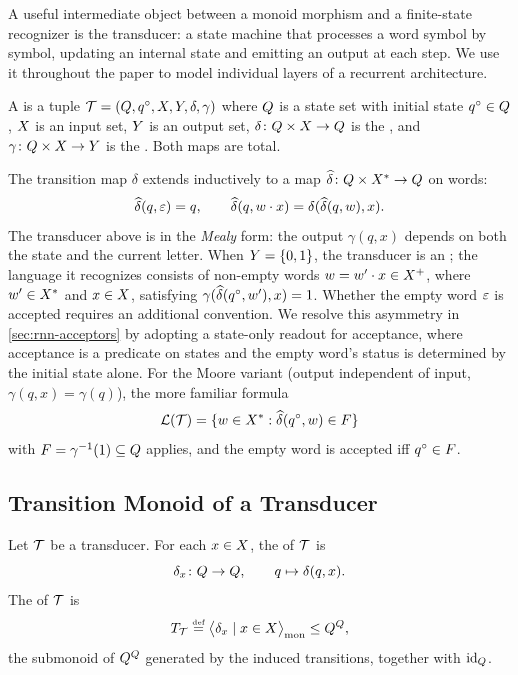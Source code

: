 \documentclass{article}
\begin{document}
A useful intermediate object between a monoid morphism and a finite-state recognizer is the transducer: a state machine that processes a word symbol by symbol, updating an internal state and emitting an output at each step. 
We use it throughout the paper to model individual layers of a recurrent architecture.

\begin{definition}
A  is a tuple $\mathcal{T} = (Q, q^{\circ}, X, Y, \delta, \gamma)$ where $Q$ is a state set with initial state $q^{\circ} \in Q$, $X$ is an input set, $Y$ is an output set, $\delta \colon Q \times X \to Q$ is the , and $\gamma \colon Q \times X \to Y$ is the . 
Both maps are total.
\end{definition}

The transition map $\delta$ extends inductively to a map $\widehat{\delta} \colon Q \times X^* \to Q$ on words:
$$
\widehat{\delta}(q, \varepsilon) = q, \qquad \widehat{\delta}(q, w \cdot x) = \delta(\widehat{\delta}(q, w), x).
$$
The transducer above is in the \emph{Mealy} form: the output $\gamma(q, x)$ depends on both the state and the current letter. When $Y = \{0, 1\}$, the transducer is an ; the language it recognizes consists of non-empty words $w = w' \cdot x \in X^+$, where $w' \in X^*$ and $x \in X$, satisfying $\gamma(\widehat{\delta}(q^{\circ}, w'), x) = 1$. 
Whether the empty word $\varepsilon$ is accepted requires an additional convention. 
We resolve this asymmetry in \cref{sec:rnn-acceptors} by adopting a state-only readout for acceptance, where acceptance is a predicate on states and the empty word's status is determined by the initial state alone.
For the Moore variant (output independent of input, $\gamma(q, x) = \gamma(q)$), the more familiar formula
$$\mathcal{L}(\mathcal{T}) = \{ w \in X^* : \widehat{\delta}(q^{\circ}, w) \in F\}$$
with $F = \gamma^{-1}(1) \subseteq Q$ applies, and the empty word is accepted iff $q^{\circ} \in F$.

\subsection{Transition Monoid of a Transducer}

\begin{definition}\label{def:induced-trans}
Let $\mathcal{T}$ be a transducer. For each $x \in X$, the  of $\mathcal{T}$ is
$$
\delta_x \colon Q \to Q, \qquad q \mapsto \delta(q, x).
$$
The  of $\mathcal{T}$ is
$$
T_{\mathcal{T}} \mathrel{\stackrel{\textnormal{\tiny def}}{=}} \bigl\langle \delta_x \mid x \in X \bigr\rangle_{\mathrm{mon}}\leq Q^Q,
$$
the submonoid of $Q^Q$ generated by the induced transitions, together with $\mathrm{id}_{Q}$.
\end{definition}
\end{document}
